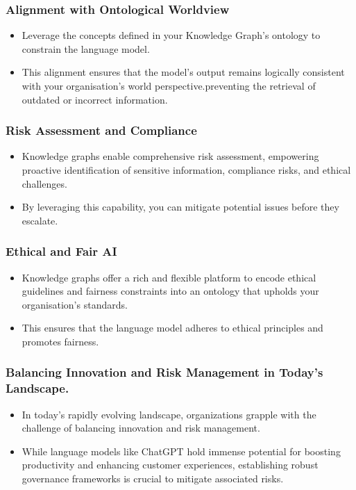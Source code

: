 \begin{frame}[fragile]\frametitle{Alignment with Ontological Worldview}
\begin{itemize}
\item Leverage the concepts defined in your Knowledge Graph's ontology to constrain the language model. 
\item This alignment ensures that the model's output remains logically consistent with your organisation's world perspective.preventing the retrieval of outdated or incorrect information.
\end{itemize}
\end{frame}

\begin{frame}[fragile]\frametitle{Risk Assessment and Compliance}
\begin{itemize}
\item Knowledge graphs enable comprehensive risk assessment, empowering proactive identification of sensitive information, compliance risks, and ethical challenges. 
\item By leveraging this capability, you can mitigate potential issues before they escalate.
\end{itemize}
\end{frame}

\begin{frame}[fragile]\frametitle{Ethical and Fair AI}
\begin{itemize}
\item Knowledge graphs offer a rich and flexible platform to encode ethical guidelines and fairness constraints into an ontology that upholds your organisation's standards.
\item This ensures that the language model adheres to ethical principles and promotes fairness.
\end{itemize}
\end{frame}

\begin{frame}[fragile]\frametitle{Balancing Innovation and Risk Management in Today's Landscape.}
\begin{itemize}
\item In today's rapidly evolving landscape, organizations grapple with the challenge of balancing innovation and risk management. 
\item While language models like ChatGPT hold immense potential for boosting productivity and enhancing customer experiences, establishing robust governance frameworks is crucial to mitigate associated risks.
\end{itemize}
\end{frame}

